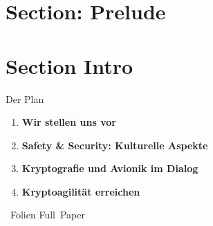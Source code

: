 \section{Section: Prelude}

\section{Section Intro}

\begin{frame}[c]{Der Plan}
  \small

  \begin{enumerate}
    \item \textbf{Wir stellen uns vor}
    \item \textbf{Safety \& Security: Kulturelle Aspekte}
    \item \textbf{Kryptografie und Avionik im Dialog}
    \item \textbf{Kryptoagilität erreichen}
  \end{enumerate}

	\vfill
	~Folien \hfill Full~Paper~

  \vfill
\end{frame}



